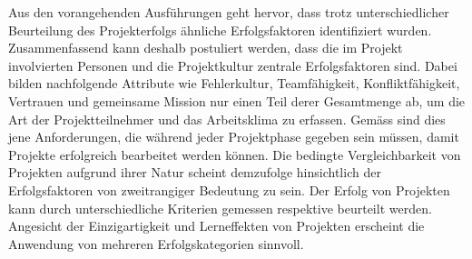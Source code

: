 \newline\newline Aus den vorangehenden Ausführungen geht hervor, dass trotz unterschiedlicher Beurteilung des Projekterfolgs ähnliche Erfolgsfaktoren identifiziert wurden. Zusammenfassend kann deshalb postuliert werden, dass die im Projekt involvierten Personen und die Projektkultur zentrale Erfolgsfaktoren sind. Dabei bilden nachfolgende Attribute wie Fehlerkultur, Teamfähigkeit, Konfliktfähigkeit, Vertrauen und gemeinsame Mission nur einen Teil derer Gesamtmenge ab, um die Art der Projektteilnehmer und das Arbeitsklima zu erfassen. Gemäss \citet{alamg16} sind dies jene Anforderungen, die während jeder Projektphase gegeben sein müssen, damit Projekte erfolgreich bearbeitet werden können. Die bedingte Vergleichbarkeit von Projekten aufgrund ihrer Natur scheint demzufolge hinsichtlich der Erfolgsfaktoren von zweitrangiger Bedeutung zu sein. Der Erfolg von Projekten kann durch unterschiedliche Kriterien gemessen respektive beurteilt werden. Angesicht der Einzigartigkeit und Lerneffekten von Projekten erscheint die Anwendung von mehreren Erfolgskategorien sinnvoll. 

